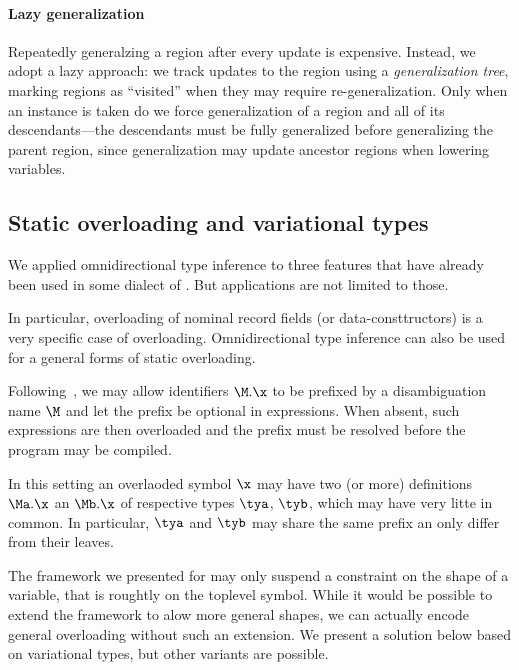 \documentclass[acmsmall,screen,nonacm,review]{acmart}
\begin{document}

\paragraph{Lazy generalization}

Repeatedly generalzing a region after every update is expensive.
Instead, we adopt a lazy approach: we track updates to the region using
a \emph{generalization tree}, marking regions as ``visited'' when they may
require re-generalization. Only when an instance is taken do we
force generalization of a region and all of its descendants---the descendants
must be fully generalized before generalizing the parent region, since
generalization may update ancestor regions when lowering variables.


\subsection{Static overloading and variational types}

We applied omnidirectional type inference to three features that have
already been used in some dialect of \ML.  But applications are not limited
to those.

In particular, overloading of nominal record fields (or data-consttructors)
is a very specific case of overloading.  Omnidirectional type inference can
also be used for a general forms of static overloading.

Following~\cite{Leijen-Ye/prefix@pldi2025},
we may allow identifiers $\M.\x$ to be prefixed by a
disambiguation name $\M$ and let the prefix be optional in expressions.
When absent, such expressions are then overloaded and the prefix must be
resolved before the program may be compiled.

In this setting an overlaoded symbol $\x$ may have two (or more) definitions
$\Ma.\x$ an $\Mb.\x$ of respective types $\tya$, $\tyb$, which may have very
litte in common. In particular, $\tya$ and $\tyb$ may share the same prefix
an only differ from their leaves.

The framework we presented for \OML may only suspend a constraint on the
shape of a variable, that is roughtly on the toplevel symbol.  While it
would be possible to extend the framework to alow more general shapes, we
can actually encode general overloading without such an extension.
We present a solution below based on variational types, but other variants
are possible.
\end{document}
